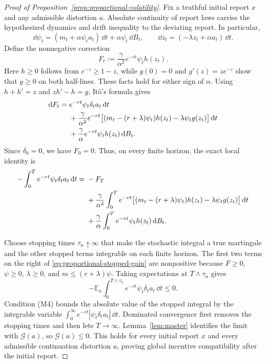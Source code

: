 \documentclass[12pt]{article}
\newcommand{\E}{\mathbb{E}}
\begin{document}
\begin{proof}[Proof of Proposition~\ref{prop:proportional-volatility}]
Fix a truthful initial report \(x\) and any admissible distortion
\(a\). Absolute continuity of report laws carries the hypothesized
dynamics and drift inequality to the deviating report. In particular,
\[
  \dd\psi_t=(m_t+\alpha\psi_ta_t)\,\dd t
             +\alpha\psi_t\,\dd B_t,
  \qquad
  \dd z_t=(-\lambda z_t+\alpha a_t)\,\dd t.
\]
Define the nonnegative correction
\[
  F_t:=\frac{\gamma}{\alpha^2}e^{-rt}\psi_th(z_t).
\]
Here \(h\geq0\) follows from \(e^{-z}\geq1-z\), while
\(g(0)=0\) and \(g'(z)=ze^{-z}\) show that \(g\geq0\) on
both half-lines. These facts hold for either sign of \(\alpha\).
Using \(h+h'=z\) and \(zh'-h=g\), It\^o's formula gives
\begin{align}
  \dd F_t
  ={}&e^{-rt}\psi_t\delta_ta_t\,\dd t\notag\\
    &+\frac{\gamma}{\alpha^2}e^{-rt}
       \bigl[(m_t-(r+\lambda)\psi_t)h(z_t)
             -\lambda\psi_tg(z_t)\bigr]\,\dd t
       \notag\\
    &+\frac{\gamma}{\alpha}e^{-rt}\psi_th(z_t)\,\dd B_t.
  \label{eq:proportional-correction}
\end{align}
Since \(\delta_0=0\), we have \(F_0=0\). Thus, on every finite
horizon, the exact local identity is
\begin{align}
  -\int_0^T e^{-rt}\psi_t\delta_ta_t\,\dd t
  ={}&-F_T\notag\\
    &+\frac{\gamma}{\alpha^2}\int_0^T e^{-rt}
       \bigl[(m_t-(r+\lambda)\psi_t)h(z_t)
             -\lambda\psi_tg(z_t)\bigr]\,\dd t
       \notag\\
    &+\frac{\gamma}{\alpha}\int_0^T
         e^{-rt}\psi_th(z_t)\,\dd B_t.
  \label{eq:proportional-stopped-gain}
\end{align}

Choose stopping times \(\tau_n\uparrow\infty\) that make the
stochastic integral a true martingale and the other stopped terms
integrable on each finite horizon. The first two terms on the right
of \eqref{eq:proportional-stopped-gain} are nonpositive because
\(F\geq0\), \(\psi\geq0\), \(\lambda\geq0\), and
\(m\leq(r+\lambda)\psi\). Taking expectations at
\(T\wedge\tau_n\) gives
\[
  -\E_x\int_0^{T\wedge\tau_n}
     e^{-rt}\psi_t\delta_ta_t\,\dd t\leq0.
\]
Condition (M4) bounds the absolute value of the stopped integral by
the integrable variable
\(\int_0^\infty e^{-rt}|\psi_t\delta_ta_t|\,\dd t\).
Dominated convergence first removes the stopping times and then
lets \(T\to\infty\). Lemma~\ref{lem:master} identifies the limit
with \(\mathcal G(a)\), so \(\mathcal G(a)\leq0\). This holds
for every initial report \(x\) and every admissible continuation
distortion \(a\), proving global incentive compatibility after the
initial report.
\end{proof}



\end{document}
